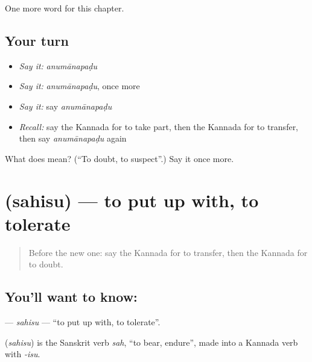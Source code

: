 \begin{grammarlens}[title={What you've built}]
One more word for this chapter.
\end{grammarlens}

\subsection*{Your turn}
\begin{itemize}
\raggedright
  \item \emph{Say it:} \emph{anumānapaḍu}
  \item \emph{Say it:} \emph{anumānapaḍu}, once more
  \item \emph{Say it:} say \emph{anumānapaḍu}
  \item \emph{Recall:} say the Kannada for to take part, then the Kannada for to transfer, then say \emph{anumānapaḍu} again
\end{itemize}

\begin{tcolorbox}[breakable,colback=teal!4,colframe=teal!35!black,title={Before you move on}]
What does  mean? (\textquotedblleft{}To doubt, to suspect\textquotedblright{}.) Say it once more.
\end{tcolorbox}
\section[\texorpdfstring{\kn{ಸಹಿಸು} (sahisu)}{ಸಹಿಸು (sahisu)}]{ (sahisu) — to put up with, to tolerate}

\label{lesson:KA-C163-sahisu}



\begin{quote}
Before the new one: say the Kannada for to transfer, then the Kannada for to doubt.
\end{quote}

\subsection*{You'll want to know: }
\textbf{} — \emph{sahisu} — \textquotedblleft{}to put up with, to tolerate\textquotedblright{}.

\begin{cousinweb}
\textbf{} (\emph{sahisu}) is the Sanskrit verb \emph{sah}, \textquotedblleft{}to bear, endure\textquotedblright{}, made into a Kannada verb with \emph{-isu}.
\end{cousinweb}

